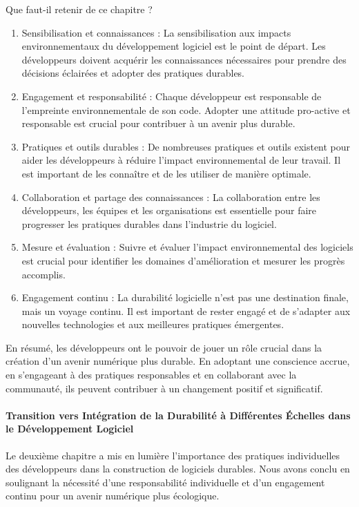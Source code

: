 Que faut-il retenir de ce chapitre ?
\begin{enumerate}
    \item Sensibilisation et connaissances : La sensibilisation aux impacts environnementaux du développement logiciel est le point de départ. Les développeurs doivent acquérir les connaissances nécessaires pour prendre des décisions éclairées et adopter des pratiques durables.
    \item Engagement et responsabilité : Chaque développeur est responsable de l'empreinte environnementale de son code. Adopter une attitude pro-active et responsable est crucial pour contribuer à un avenir plus durable.
    \item Pratiques et outils durables : De nombreuses pratiques et outils existent pour aider les développeurs à réduire l'impact environnemental de leur travail. Il est important de les connaître et de les utiliser de manière optimale.
    \item Collaboration et partage des connaissances : La collaboration entre les développeurs, les équipes et les organisations est essentielle pour faire progresser les pratiques durables dans l'industrie du logiciel.
    \item Mesure et évaluation : Suivre et évaluer l'impact environnemental des logiciels est crucial pour identifier les domaines d'amélioration et mesurer les progrès accomplis.
    \item Engagement continu : La durabilité logicielle n'est pas une destination finale, mais un voyage continu. Il est important de rester engagé et de s'adapter aux nouvelles technologies et aux meilleures pratiques émergentes.
\end{enumerate}


En résumé, les développeurs ont le pouvoir de jouer un rôle crucial dans la création d'un avenir numérique plus durable. 
En adoptant une conscience accrue, en s'engageant à des pratiques responsables et en collaborant avec la communauté, ils peuvent contribuer à un changement positif et significatif.

\paragraph{Transition vers Intégration de la Durabilité à Différentes Échelles dans le Développement Logiciel}
Le deuxième chapitre a mis en lumière l'importance des pratiques individuelles des développeurs dans la construction de logiciels durables. Nous avons conclu en soulignant la nécessité d'une responsabilité individuelle et d'un engagement continu pour un avenir numérique plus écologique.


